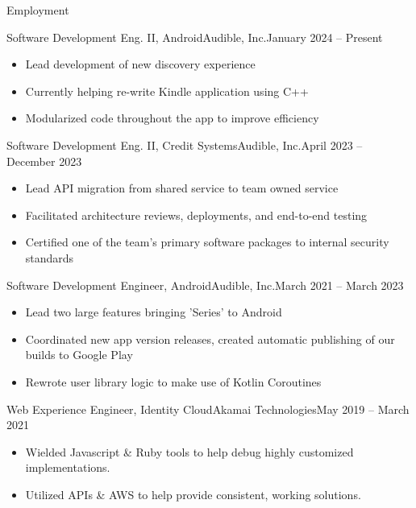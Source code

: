 \documentclass[]{mcdowellcv}
\begin{document}
	\makeheader
	
	\begin{cvsection}{Employment}
        \begin{cvsubsection}{Software Development Eng. II, Android}{Audible, Inc.}{January 2024 -- Present}
		\vspace{2mm}
			\begin{itemize}
				\item Lead development of new discovery experience
				\item Currently helping re-write Kindle application using C++
				\item Modularized code throughout the app to improve efficiency
			\end{itemize}
		\end{cvsubsection}

		\begin{cvsubsection}{Software Development Eng. II, Credit Systems}{Audible, Inc.}{April 2023 -- December 2023}
		\vspace{2mm}
			\begin{itemize}
				\item Lead API migration from shared service to team owned service
				\item Facilitated architecture reviews, deployments, and end-to-end testing
				\item Certified one of the team's primary software packages to internal security standards
			\end{itemize}
		\end{cvsubsection}
		
		\begin{cvsubsection}{Software Development Engineer, Android}{Audible, Inc.}{March 2021 -- March 2023}
		\vspace{2mm}
			\begin{itemize}
				\item Lead two large features bringing 'Series' to Android
				\item Coordinated new app version releases, created automatic publishing of our builds to Google Play
				\item Rewrote user library logic to make use of Kotlin Coroutines
			\end{itemize}
		\end{cvsubsection}
		
		\begin{cvsubsection}{Web Experience Engineer, Identity Cloud}{Akamai Technologies}{May 2019 -- March 2021}
		\vspace{2mm}
			\begin{itemize}
				\item Wielded Javascript \& Ruby tools to help debug highly customized implementations.
				\item Utilized APIs \& AWS to help provide consistent, working solutions.
			\end{itemize}
		\end{cvsubsection}
		

\end{cvsection}
\end{document}
